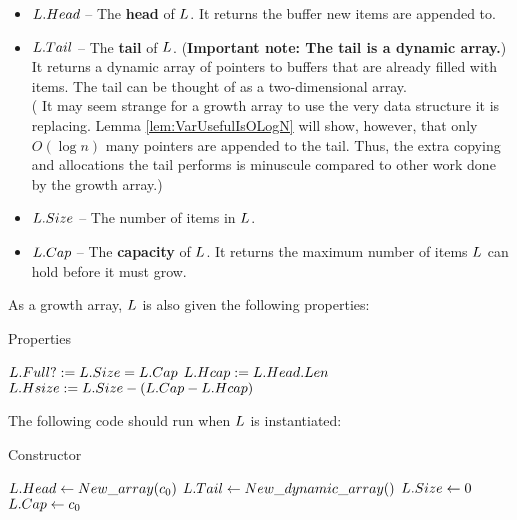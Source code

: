 \begin{itemize}
	\item $L.Head$ -- The \textbf{head} of $\VarList$. It returns the buffer new items are appended to.
	\item $L.Tail$ -- The \textbf{tail} of $\VarList$. (\textbf{Important note: The tail is a dynamic array.}) It returns a dynamic array of pointers to buffers that are already filled with items. The tail can be thought of as a two-dimensional array.\\
	({\HdrRemark} It may seem strange for a growth array to use the very data structure it is replacing. Lemma \ref{lem:VarUsefulIsOLogN} will show, however, that only $O(\log n)$ many pointers are appended to the tail. Thus, the extra copying and allocations the tail performs is minuscule compared to other work done by the growth array.)
	\item $L.Size$ -- The number of items in $\VarList$.
	\item $L.Cap$ -- The \textbf{capacity} of $\VarList$. It returns the maximum number of items $\VarList$ can hold before it must grow.
\end{itemize}

As a growth array, $\VarList$ is also given the following properties:

\begin{algorithm}[H]
	\caption{Properties \TextGrowthArray}
	\begin{algorithmic}
		\State $L.Full? := L.Size = L.Cap$
		\State
		\State $L.Hcap := L.Head.Len$
		\State
		\State $L.Hsize := L.Size - \left(L.Cap - L.Hcap\right)$
	\end{algorithmic}
\end{algorithm}

The following code should run when $\VarList$ is instantiated:

\begin{algorithm}[H]
	\caption{Constructor \TextGrowthArray}
	\begin{algorithmic}
		\Procedure{$\FuncConstructor$}{$\VarList$}
			\State $L.Head \gets New\_array(c_0)$
			\State $L.Tail \gets New\_dynamic\_array()$
			\State $L.Size \gets 0$
			\State $L.Cap \gets c_0$
		\EndProcedure
	\end{algorithmic}
\end{algorithm}